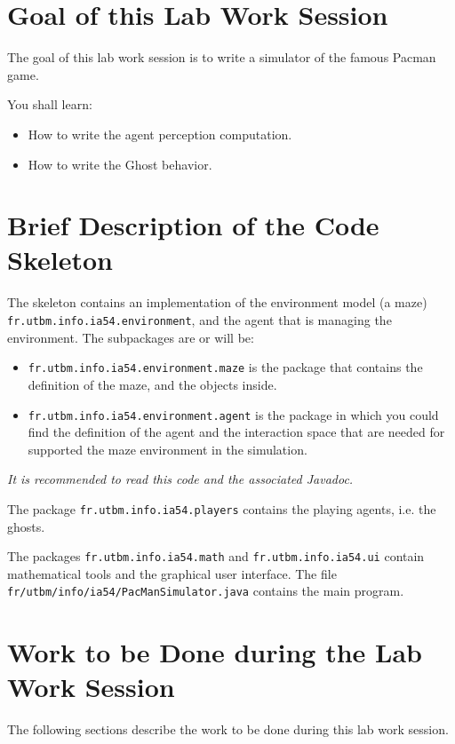 \documentclass[article,english,nodocumentinfo]{multiagentfrreport}
\begin{document}
\section{Goal of this Lab Work Session}

The goal of this lab work session is to write a simulator of the famous Pacman game.

You shall learn: 
\begin{itemize}
\item How to write the agent perception computation.
\item How to write the Ghost behavior.
\end{itemize}



\section{Brief Description of the Code Skeleton}

The skeleton contains an implementation of the environment model (a maze) \texttt{fr.utbm.info.ia54.environment}, and the agent that is managing the environment.
The subpackages are or will be:
\begin{itemize}
\item \texttt{fr.utbm.info.ia54.environment.maze} is the package that contains the definition of the maze, and the objects inside.
\item \texttt{fr.utbm.info.ia54.environment.agent} is the package in which you could find the definition of the agent and the interaction space that are needed for supported the maze environment in the simulation.
\end{itemize}

\emph{It is recommended to read this code and the associated Javadoc.}

The package \texttt{fr.utbm.info.ia54.players} contains the playing agents, i.e. the ghosts.

The packages \texttt{fr.utbm.info.ia54.math} and \texttt{fr.utbm.info.ia54.ui} contain mathematical tools and the graphical user interface.
The file \texttt{fr/utbm/info/ia54/PacManSimulator.java} contains the main program.

\section{Work to be Done during the Lab Work Session}

The following sections describe the work to be done during this lab work session.
\end{document}
